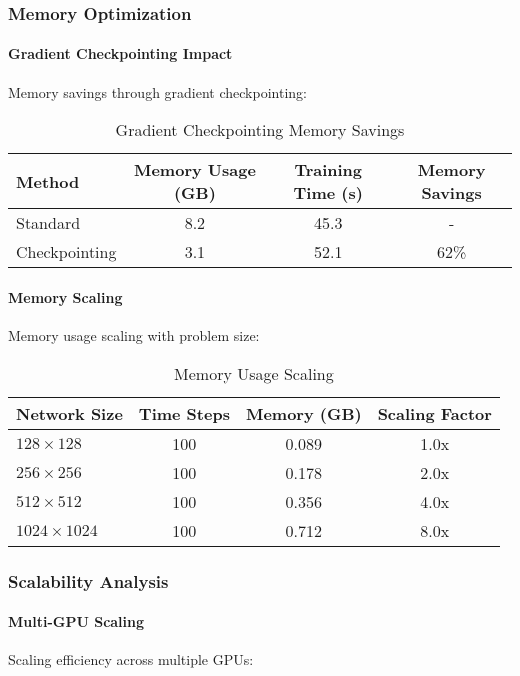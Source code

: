 \subsubsection{Memory Optimization}

\paragraph{Gradient Checkpointing Impact}
Memory savings through gradient checkpointing:

\begin{table}[h]
\centering
\caption{Gradient Checkpointing Memory Savings}
\begin{tabular}{lccc}
\toprule
Method & Memory Usage (GB) & Training Time (s) & Memory Savings \\
\midrule
Standard & 8.2 & 45.3 & - \\
Checkpointing & 3.1 & 52.1 & 62\% \\
\bottomrule
\end{tabular}
\end{table}

\paragraph{Memory Scaling}
Memory usage scaling with problem size:

\begin{table}[h]
\centering
\caption{Memory Usage Scaling}
\begin{tabular}{lccc}
\toprule
Network Size & Time Steps & Memory (GB) & Scaling Factor \\
\midrule
$128 \times 128$ & 100 & 0.089 & 1.0x \\
$256 \times 256$ & 100 & 0.178 & 2.0x \\
$512 \times 512$ & 100 & 0.356 & 4.0x \\
$1024 \times 1024$ & 100 & 0.712 & 8.0x \\
\bottomrule
\end{tabular}
\end{table}

\subsubsection{Scalability Analysis}

\paragraph{Multi-GPU Scaling}
Scaling efficiency across multiple GPUs:

